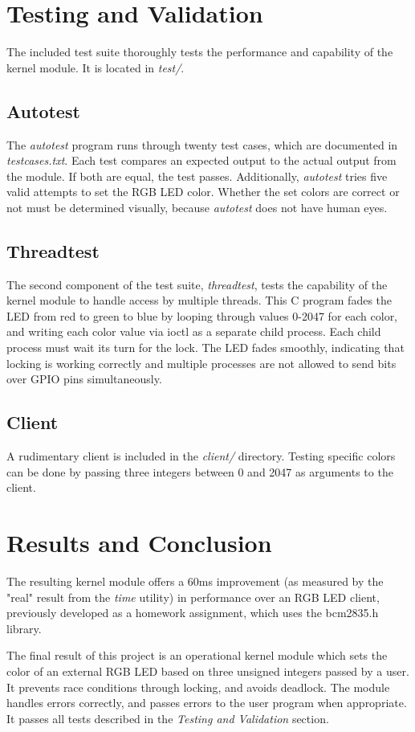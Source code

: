 \documentclass[10pt]{article}
\begin{document}
\section{Testing and Validation}
The included test suite thoroughly tests the performance and capability of the kernel module. It is located in \emph{test/}. 
\subsection{Autotest} The \emph{autotest} program runs through twenty test cases, which are documented in \emph{testcases.txt}. Each test compares an expected output to the actual output from the module. If both are equal, the test passes. Additionally, \emph{autotest} tries five valid attempts to set the RGB LED color. Whether the set colors are correct or not must be determined visually, because \emph{autotest} does not have human eyes.

\subsection{Threadtest}
The second component of the test suite, \emph{threadtest}, tests the capability of the kernel module to handle access by multiple threads. This C program fades the LED from red to green to blue by looping through values 0-2047 for each color, and writing each color value via ioctl as a separate child process. Each child process must wait its turn for the lock. The LED fades smoothly, indicating that locking is working correctly and multiple processes are not allowed to send bits over GPIO pins simultaneously.

\subsection{Client}
A rudimentary client is included in the \emph{client/} directory. Testing specific colors can be done by passing three integers between 0 and 2047 as arguments to the client.

\section{Results and Conclusion}
\noindent The resulting kernel module offers a 60ms improvement (as measured by the "real" result from the \emph{time} utility) in performance over an RGB LED client, previously developed as a homework assignment, which uses the bcm2835.h library.
\newline

\noindent The final result of this project is an operational kernel module which sets the color of an external RGB LED based on three unsigned integers passed by a user. It prevents race conditions through locking, and avoids deadlock. The module handles errors correctly, and passes errors to the user program when appropriate. It passes all tests described in the \emph{Testing and Validation} section. 
\end{document}
